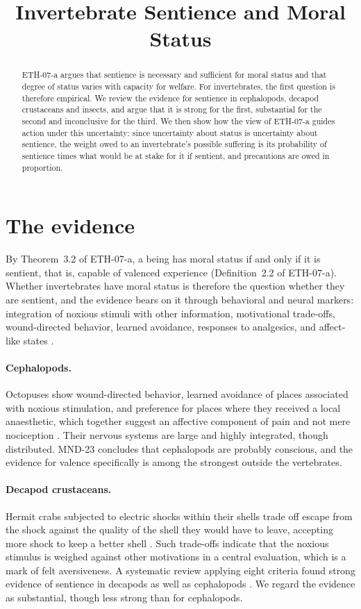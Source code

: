 \documentclass{situationist-preprint}
\title{Invertebrate Sentience and Moral Status}
\begin{document}
\maketitle

\begin{abstract}
ETH-07-a argues that sentience is necessary and sufficient for moral status and that degree of status varies with capacity for welfare. For invertebrates, the first question is therefore empirical. We review the evidence for sentience in cephalopods, decapod crustaceans and insects, and argue that it is strong for the first, substantial for the second and inconclusive for the third. We then show how the view of ETH-07-a guides action under this uncertainty: since uncertainty about status is uncertainty about sentience, the weight owed to an invertebrate's possible suffering is its probability of sentience times what would be at stake for it if sentient, and precautions are owed in proportion.
\end{abstract}

\section{The evidence}

By Theorem~3.2 of ETH-07-a, a being has moral status if and only if it is sentient, that is, capable of valenced experience (Definition~2.2 of ETH-07-a). Whether invertebrates have moral status is therefore the question whether they are sentient, and the evidence bears on it through behavioral and neural markers: integration of noxious stimuli with other information, motivational trade-offs, wound-directed behavior, learned avoidance, responses to analgesics, and affect-like states \citep{Birch2021}.

\paragraph{Cephalopods.} Octopuses show wound-directed behavior, learned avoidance of places associated with noxious stimulation, and preference for places where they received a local anaesthetic, which together suggest an affective component of pain and not mere nociception \citep{Crook2021}. Their nervous systems are large and highly integrated, though distributed. MND-23 concludes that cephalopods are probably conscious, and the evidence for valence specifically is among the strongest outside the vertebrates.

\paragraph{Decapod crustaceans.} Hermit crabs subjected to electric shocks within their shells trade off escape from the shock against the quality of the shell they would have to leave, accepting more shock to keep a better shell \citep{Elwood2009}. Such trade-offs indicate that the noxious stimulus is weighed against other motivations in a central evaluation, which is a mark of felt aversiveness. A systematic review applying eight criteria found strong evidence of sentience in decapods as well as cephalopods \citep{Birch2021}. We regard the evidence as substantial, though less strong than for cephalopods.
\end{document}
